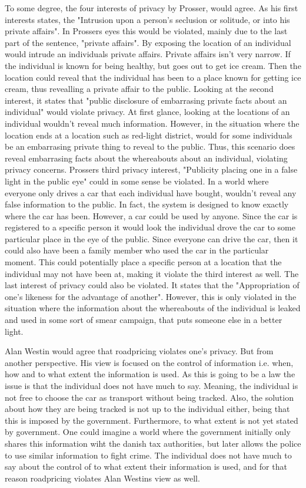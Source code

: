 To some degree, the four interests of privacy by Prosser, would agree. 
As his first interests states, the "Intrusion upon a person's seclusion or solitude, or into his private affairs". In Prossers eyes this would be violated, mainly due to the last part of the sentence, "private affairs". By exposing the location of an individual would intrude an individuals private affairs. Private affairs isn't very narrow. If the individual is known for being healthy, but goes out to get ice cream. Then the location could reveal that the individual has been to a place known for getting ice cream, thus revealling a private affair to the public.  
Looking at the second interest, it states that "public disclosure of embarrasing private facts about an individual" would violate privacy. At first glance, looking at the locations of an individual wouldn't reveal much information. However, in the situation where the location ends at a location such as red-light district, would for some individuals be an embarrasing private thing to reveal to the public. Thus, this scenario does reveal embarrasing facts about the whereabouts about an individual, violating privacy concerns. Prossers third privacy interest, "Publicity placing one in a false light in the public eye" could in some sense be violated. In a world where everyone only drives a car that each individual have bought, wouldn't reveal any false information to the public. In fact, the system is designed to know exactly where the car has been. However, a car could be used by anyone. Since the car is registered to a specific person it would look the individual drove the car to some particular place in the eye of the public. Since everyone can drive the car, then it could also have been a family member who used the car in the particular moment. This could potentially place a specific person at a location that the individual may not have been at, making it violate the third interest as well. 
The last interest of privacy could also be violated. It states that the "Appropriation of one's likeness for the advantage of another". However, this is only violated in the situation where the information about the whereabouts of the individual is leaked and used in some sort of smear campaign, that puts someone else in a better light.  

Alan Westin would agree that roadpricing violates one's privacy. But from another perspective. His view is focused on the control of information i.e. when, how and to what extent the information is used. As this is going to be a law the issue is that the individual does not have much to say. Meaning, the individual is not free to choose the car as transport without being tracked. Also, the solution about how they are being tracked is not up to the individual either, being that this is imposed by the government. Furthermore, to what extent is not yet stated by government. One could imagine a world where the government initially only shares this information wiht the danish tax authorities, but later allows the police to use similar information to fight crime. The individual does not have much to say about the control of to what extent their information is used, and for that reason roadpricing violates Alan Westins view as well.  

